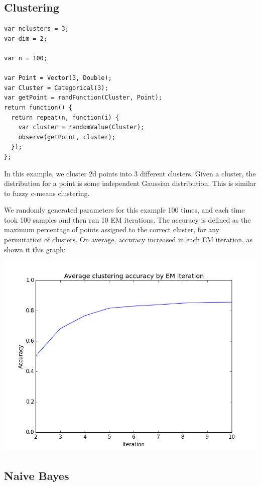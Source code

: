 \documentclass{article}
\begin{document}
  \subsection{Clustering}
{\small
\begin{verbatim}
var nclusters = 3;
var dim = 2;

var n = 100;

var Point = Vector(3, Double);
var Cluster = Categorical(3);
var getPoint = randFunction(Cluster, Point);
return function() {
  return repeat(n, function(i) {
    var cluster = randomValue(Cluster);
    observe(getPoint, cluster);
  });
};
\end{verbatim}
}

In this example, we cluster 2d points into 3 different clusters.  Given a cluster, the distribution for a point is some independent Gaussian distribution.  This is similar to fuzzy c-means clustering.

We randomly generated parameters for this example 100 times, and each time took 100 samples and then ran 10 EM iterations.  The accuracy is defined as the maximum percentage of points assigned to the correct cluster, for any permutation of clusters.  On average, accuracy increased in each EM iteration, as shown it this graph:

\begin{center}
\includegraphics[scale=0.4]{cluster_accuracy.png}
\end{center}

\subsection{Naive Bayes}
\end{document}
